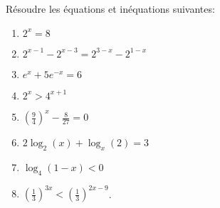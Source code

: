 
\begin{exercice}\label{exoINGE11140024}

	Résoudre les équations et inéquations suivantes:
	\begin{enumerate}

		\item
			$2^x=8$
		\item
			$2^{x-1}-2^{x-3}=2^{3-x}-2^{1-x}$
		\item
			$e^x+5e^{-x}=6$
		\item
			$2^x>4^{x+1}$
		\item
			$\left( \frac{ 9 }{ 4 } \right)^x-\frac{ 8 }{ 27 }=0$
		\item
			$2\log_2(x)+\log_x(2)=3$
		\item
			$\log_4(1-x)<0$
		\item
			$\left( \frac{1}{ 3 } \right)^{3x}<\left( \frac{1}{ 3 } \right)^{2x-9}$.

	\end{enumerate}

\end{exercice}
